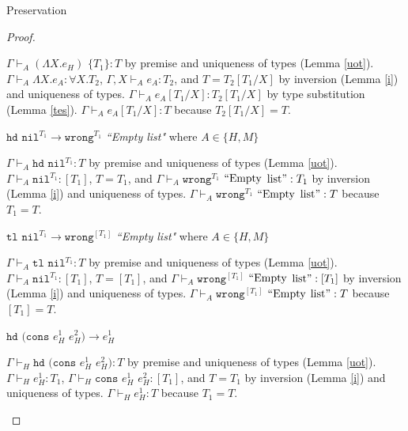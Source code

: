 \begin{theorem}{Preservation}
\begin{proof}
\begin{case}
$\Gamma\vdash_{A}(\Lambda X.e_{H})$ $\lbrace T_{1}\rbrace:T$ by premise and uniqueness of types (Lemma \ref{uot}).  $\Gamma\vdash_{A}\Lambda X.e_{A}:\forall X.T_{2}$, $\Gamma,X\vdash_{A}e_{A}:T_{2}$, and $T=T_{2}[T_{1}/X]$ by inversion (Lemma \ref{i}) and uniqueness of types.  $\Gamma\vdash_{A}e_{A}[T_{1}/X]:T_{2}[T_{1}/X]$ by type substitution (Lemma \ref{tes}).  $\Gamma\vdash_{A}e_{A}[T_{1}/X]:T$ because $T_{2}[T_{1}/X]=T$.
\end{case}


\begin{case}
$\mathtt{hd}$ $\mathtt{nil}^{T_{1}}\rightarrow\mathtt{wrong}^{T_{1}}$ \emph{``Empty list"} where $A\in\lbrace H,M\rbrace$

$\Gamma\vdash_{A}\mathtt{hd}$ $\mathtt{nil}^{T_{1}}:T$ by premise and uniqueness of types (Lemma \ref{uot}).  $\Gamma\vdash_{A}\mathtt{nil}^{T_{1}}:[T_{1}]$, $T=T_{1}$, and $\Gamma\vdash_{A}\mathtt{wrong}^{T_{1}}$ $\mathrm{``Empty}$ $\mathrm{list"}:T_{1}$ by inversion (Lemma \ref{i}) and uniqueness of types.  $\Gamma\vdash_{A}\mathtt{wrong}^{T_{1}}$ $\mathrm{``Empty}$ $\mathrm{list"}:T$ because $T_{1}=T$.
\end{case}


\begin{case}
$\mathtt{tl}$ $\mathtt{nil}^{T_{1}}\rightarrow\mathtt{wrong}^{[T_{1}]}$ \emph{``Empty list"} where $A\in\lbrace H,M\rbrace$

$\Gamma\vdash_{A}\mathtt{tl}$ $\mathtt{nil}^{T_{1}}:T$ by premise and uniqueness of types (Lemma \ref{uot}).  $\Gamma\vdash_{A}\mathtt{nil}^{T_{1}}:[T_{1}]$, $T=[T_{1}]$, and $\Gamma\vdash_{A}\mathtt{wrong}^{[T_{1}]}$ $\mathrm{``Empty}$ $\mathrm{list"}:[T_{1}]$ by inversion (Lemma \ref{i}) and uniqueness of types.  $\Gamma\vdash_{A}\mathtt{wrong}^{[T_{1}]}$ $\mathrm{``Empty}$ $\mathrm{list"}:T$ because $[T_{1}]=T$.
\end{case}


\begin{case}
$\mathtt{hd}$ $(\mathtt{cons}$ $e_{H}^{1}$ $e_{H}^{2})\rightarrow e_{H}^{1}$

$\Gamma\vdash_{H}\mathtt{hd}$ $(\mathtt{cons}$ $e_{H}^{1}$ $e_{H}^{2}):T$ by premise and uniqueness of types (Lemma \ref{uot}).  $\Gamma\vdash_{H}e_{H}^{1}:T_{1}$, $\Gamma\vdash_{H}\mathtt{cons}$ $e_{H}^{1}$ $e_{H}^{2}:[T_{1}]$, and $T=T_{1}$ by inversion (Lemma \ref{i}) and uniqueness of types.  $\Gamma\vdash_{H}e_{H}^{1}:T$ because $T_{1}=T$.
\end{case}


\end{proof}
\end{theorem}
